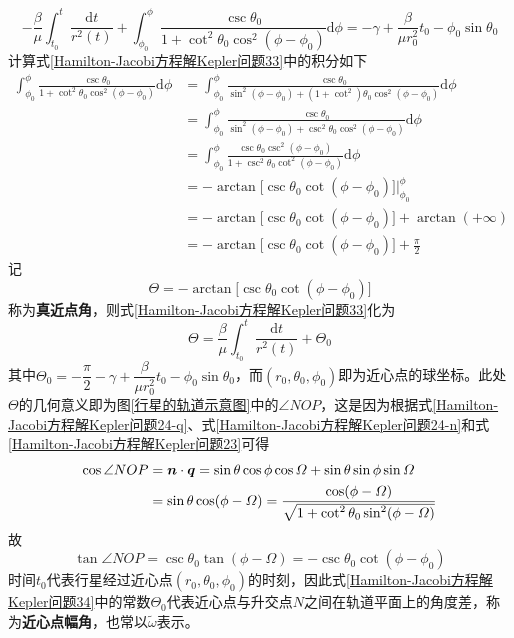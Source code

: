 \begin{equation}
	-\frac{\beta}{\mu}\int_{t_0}^t \frac{\mathrm{d}t}{r^2(t)} + \int_{\phi_0}^\phi \frac{\csc\theta_0}{1+\cot^2\theta_0\cos^2(\phi-\phi_0)}\mathrm{d}\phi = -\gamma+\frac{\beta}{\mu r_0^2}t_0-\phi_0\sin\theta_0
	\label{Hamilton-Jacobi方程解Kepler问题33}
\end{equation}
计算式\eqref{Hamilton-Jacobi方程解Kepler问题33}中的积分如下
\begin{align*}
	\int_{\phi_0}^\phi \frac{\csc\theta_0}{1+\cot^2\theta_0\cos^2(\phi-\phi_0)}\mathrm{d}\phi & = \int_{\phi_0}^\phi \frac{\csc\theta_0}{\sin^2(\phi-\phi_0)+(1+\cot^2)\theta_0\cos^2(\phi-\phi_0)} \mathrm{d}\phi \\
	& = \int_{\phi_0}^\phi \frac{\csc\theta_0}{\sin^2(\phi-\phi_0)+\csc^2\theta_0\cos^2(\phi-\phi_0)} \mathrm{d}\phi \\
	& = \int_{\phi_0}^\phi \frac{\csc\theta_0\csc^2(\phi-\phi_0)}{1+\csc^2\theta_0\cot^2(\phi-\phi_0)} \mathrm{d}\phi \\
	& = -\arctan\big[\csc\theta_0\cot(\phi-\phi_0)\big]\bigg|_{\phi_0}^\phi \\
	& = -\arctan\big[\csc\theta_0\cot(\phi-\phi_0)\big]+\arctan(+\infty) \\
	& = -\arctan\big[\csc\theta_0\cot(\phi-\phi_0)\big] + \frac{\pi}{2}
\end{align*}
记
\begin{equation}
	\varTheta = -\arctan\big[\csc\theta_0\cot(\phi-\phi_0)\big]
	\label{Hamilton-Jacobi方程解Kepler问题34-1}
\end{equation}
称为{\bf 真近点角}，则式\eqref{Hamilton-Jacobi方程解Kepler问题33}化为
\begin{equation}
	\varTheta = \frac{\beta}{\mu}\int_{t_0}^t \frac{\mathrm{d}t}{r^2(t)}+\varTheta_0
	\label{Hamilton-Jacobi方程解Kepler问题34}
\end{equation}
其中$\varTheta_0=-\dfrac{\pi}{2}-\gamma+\dfrac{\beta}{\mu r_0^2}t_0-\phi_0\sin\theta_0$，而$(r_0,\theta_0,\phi_0)$即为近心点的球坐标。此处$\varTheta$的几何意义即为图\ref{行星的轨道示意图}中的$\angle NOP$，这是因为根据式\eqref{Hamilton-Jacobi方程解Kepler问题24-q}、式\eqref{Hamilton-Jacobi方程解Kepler问题24-n}和式\eqref{Hamilton-Jacobi方程解Kepler问题23}可得
\begin{align*}
	\cos \angle NOP & = \boldsymbol{n}\cdot \boldsymbol{q} = \sin\theta\cos\phi\cos\varOmega+ \sin\theta\sin\phi\sin\varOmega \\
	& = \sin\theta\cos(\phi-\varOmega) = \frac{\cos(\phi-\varOmega)}{\sqrt{1+\cot^2\theta_0\sin^2(\phi-\varOmega)}}
\end{align*}
故
\begin{equation*}
	\tan\angle NOP = \csc\theta_0\tan(\phi-\varOmega) = -\csc\theta_0\cot(\phi-\phi_0)
\end{equation*}
时间$t_0$代表行星经过近心点$(r_0,\theta_0,\phi_0)$的时刻，因此式\eqref{Hamilton-Jacobi方程解Kepler问题34}中的常数$\varTheta_0$代表近心点与升交点$N$之间在轨道平面上的角度差，称为{\bf 近心点幅角}，也常以$\tilde{\omega}$表示。%

